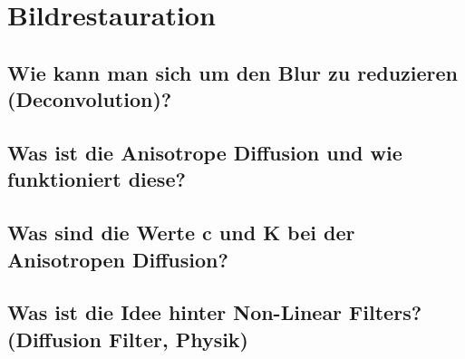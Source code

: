 \section{Bildrestauration}

\subsection{Wie kann man sich um den Blur zu reduzieren (Deconvolution)?}

\subsection{Was ist die Anisotrope Diffusion und wie funktioniert diese?}

\subsection{Was sind die Werte c und K bei der Anisotropen Diffusion?}

\subsection{Was ist die Idee hinter Non-Linear Filters? (Diffusion Filter, Physik)}

